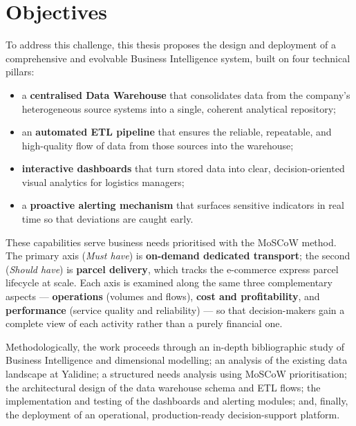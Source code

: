 \section*{Objectives}

To address this challenge, this thesis proposes the design and deployment of a comprehensive and
evolvable Business Intelligence system, built on four technical pillars:

\begin{itemize}
    \item a \textbf{centralised Data Warehouse} that consolidates data from the company's
          heterogeneous source systems into a single, coherent analytical repository;
    \item an \textbf{automated ETL pipeline} that ensures the reliable, repeatable, and
          high-quality flow of data from those sources into the warehouse;
    \item \textbf{interactive dashboards} that turn stored data into clear, decision-oriented
          visual analytics for logistics managers;
    \item a \textbf{proactive alerting mechanism} that surfaces sensitive indicators in real
          time so that deviations are caught early.
\end{itemize}

These capabilities serve business needs prioritised with the MoSCoW method. The primary axis
(\textit{Must have}) is \textbf{on-demand dedicated transport}; the second (\textit{Should have})
is \textbf{parcel delivery}, which tracks the e-commerce express parcel lifecycle at scale. Each
axis is examined along the same three complementary aspects --- \textbf{operations} (volumes and
flows), \textbf{cost and profitability}, and \textbf{performance} (service quality and
reliability) --- so that decision-makers gain a complete view of each activity rather than a
purely financial one.

Methodologically, the work proceeds through an in-depth bibliographic study of Business
Intelligence and dimensional modelling; an analysis of the existing data landscape at Yalidine;
a structured needs analysis using MoSCoW prioritisation; the architectural design of the data
warehouse schema and ETL flows; the implementation and testing of the dashboards and alerting
modules; and, finally, the deployment of an operational, production-ready decision-support
platform.

